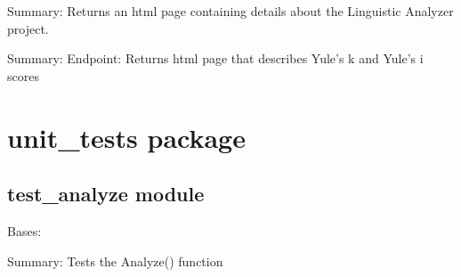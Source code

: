 \documentclass[letterpaper,10pt,english]{sphinxmanual}
\begin{document}

\begin{fulllineitems}
\label{\detokenize{app:app.project}}
Summary: Returns an html page containing details about the Linguistic Analyzer project.

\end{fulllineitems}


\begin{fulllineitems}
\label{\detokenize{app:app.yulesinfo}}
Summary: Endpoint: Returns html page that describes Yule’s k and Yule’s i scores

\end{fulllineitems}



\chapter{unit\_tests package}
\label{\detokenize{unit_tests::doc}}\label{\detokenize{unit_tests:unit-tests-package}}

\section{test\_analyze module}
\label{\detokenize{unit_tests:module-unit_tests.test_analyze}}\label{\detokenize{unit_tests:test-analyze-module}}

\begin{fulllineitems}
\label{\detokenize{unit_tests:unit_tests.test_analyze.TestAnalyze}}
Bases: 

\begin{fulllineitems}
\label{\detokenize{unit_tests:unit_tests.test_analyze.TestAnalyze.test_analyze}}
Summary: Tests the Analyze() function

\end{fulllineitems}


\end{fulllineitems}
\end{document}
